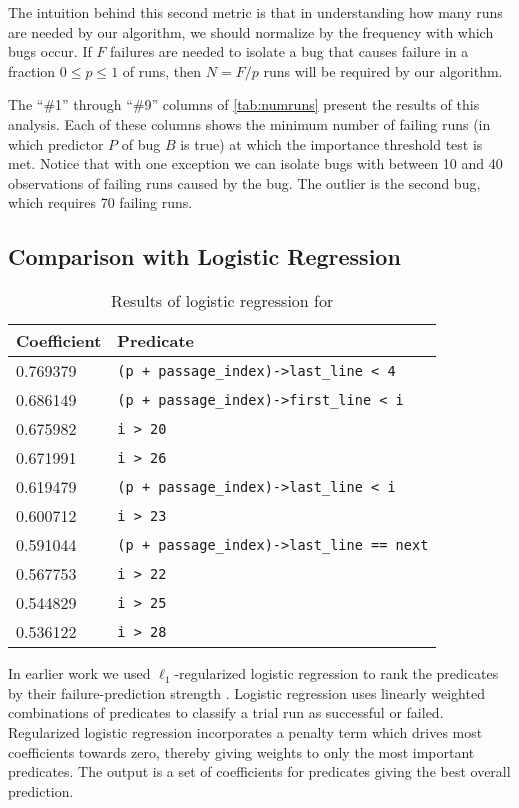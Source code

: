 The intuition behind this second metric is that in understanding how
many runs are needed by our algorithm, we should normalize by the
frequency with which bugs occur.  If $F$ failures are needed to
isolate a bug that causes failure in a fraction $0 \leq p \leq 1$ of
runs, then $N = F/p$ runs will be required by our algorithm.

The ``\#1'' through ``\#9'' columns of \autoref{tab:numruns} present
the results of this analysis.  Each of these columns shows the minimum
number of failing runs (in which predictor $P$ of bug $B$ is true) at
which the importance threshold test is met.  Notice that with one
exception we can isolate bugs with between 10 and 40 observations of
failing runs caused by the bug.  The outlier is the second
\rhythmbox{} bug, which requires 70 failing runs.

\subsection{Comparison with Logistic Regression}
\label{sec:comparison}

\begin{table}
\nocaptionrule
\caption{Results of logistic regression for \moss}
\label{tab:logregression}
\centering
\scriptsize
\begin{tabular}{ll}
  \toprule
  Coefficient & Predicate \\
  \midrule
  0.769379 & \verb|(p + passage_index)->last_line < 4| \\
  0.686149 & \verb|(p + passage_index)->first_line < i| \\
  0.675982 & \verb|i > 20| \\
  0.671991 & \verb|i > 26| \\
  0.619479 & \verb|(p + passage_index)->last_line < i| \\
  0.600712 & \verb|i > 23| \\
  0.591044 & \verb|(p + passage_index)->last_line == next| \\
  0.567753 & \verb|i > 22| \\
  0.544829 & \verb|i > 25| \\
  0.536122 & \verb|i > 28| \\
  \bottomrule
\end{tabular}
\end{table}


In earlier work
we used $\ell_1$-regularized logistic regression
to rank the predicates by their
failure-prediction strength \cite{PLDI`03*141,NIPS2003_AP05}.
Logistic regression uses linearly weighted
combinations of predicates to classify a trial run as successful or
failed.  Regularized logistic regression incorporates a penalty
term which drives most coefficients towards zero, thereby
giving weights to only the most important predicates.  The output
is a set of coefficients for predicates giving the best overall prediction.

